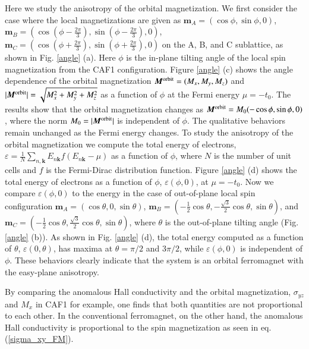 \documentclass[letter,twocolumn,amsmath,amssymb,superscriptaddress]{jpsj3}
\newcommand{\vm}{\bm{m}}
\newcommand{\vM}{\bm{M}}
\newcommand{\vk}{\bm{k}}
\begin{document}
Here we study the anisotropy of the orbital magnetization. We first consider the case where the local magnetizations are given as
$\vm_A=(\cos\phi,\sin\phi,0)$, $\vm_B=(\cos(\phi-\frac{2\pi}{3}),\sin(\phi-\frac{2\pi}{3}),0)$, 
$\vm_C=(\cos(\phi+\frac{2\pi}{3}),\sin(\phi+\frac{2\pi}{3}),0)$ on the A, B, and C sublattice, as shown in Fig. \ref{angle} (a).
Here $\phi$ is the in-plane tilting angle of the local spin magnetization from the CAF1 configuration.
Figure \ref{angle} (c) shows the angle dependence of the orbital magnetization $\vM^{\rm orbit}=(M_x, M_y, M_z)$ and $|\vM^{\rm orbit}|=\sqrt{M_x^2+M_y^2+M_z^2}$ as a function of $\phi$ at the Fermi energy $\mu=-t_0$. 
The results show that the orbital magnetization changes as $\vM^{\rm orbit}=M_0(-\cos\phi,\sin\phi,0)$, where the norm $M_0=|\vM^{\rm orbit}|$ is independent of $\phi$.
The qualitative behaviors remain unchanged as the Fermi energy changes.
To study the anisotropy of the orbital magnetization we compute the total energy of electrons,
$ \varepsilon=\frac{1}{N}\sum_{n,\vk}E_{n\vk}f(E_{n\vk}-\mu)$
as a function of $\phi$,
where $N$ is the number of unit cells and $f$ is the Fermi-Dirac distribution function. 
Figure \ref{angle} (d) shows the total energy of electrons as a function of $\phi$, $\varepsilon(\phi,0)$, at $\mu=-t_0$.
Now we compare $\varepsilon(\phi,0)$ to the energy in the case of out-of-plane local spin configuration
$\vm_A=(\cos\theta,0,\sin\theta)$, $\vm_B=(-\frac{1}{2}\cos\theta,-\frac{\sqrt{3}}{2}\cos\theta,\sin\theta)$, and $\vm_C=(-\frac{1}{2}\cos\theta,\frac{\sqrt{3}}{2}\cos\theta,\sin\theta)$, where $\theta$ is the out-of-plane tilting angle (Fig. \ref{angle} (b)).
As shown in Fig. \ref{angle} (d), the total energy computed as a function of $\theta$, $\varepsilon(0,\theta)$, has maxima at $\theta=\pi/2$ and $3\pi/2$, while $\varepsilon(\phi,0)$ is independent of $\phi$.
These behaviors clearly indicate that the system is an orbital ferromagnet with the easy-plane anisotropy.




By comparing the anomalous Hall conductivity and the orbital magnetization, $\sigma_{yz}$ and $M_x$ in CAF1 for example, one finds that both quantities are not proportional to each other. In the conventional ferromagnet, on the other hand, the anomalous Hall conductivity is proportional to the spin magnetization as seen in eq. (\ref{sigma_xy_FM}).
\end{document}
